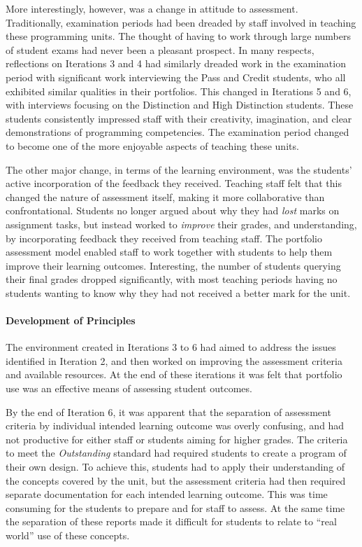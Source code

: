 More interestingly, however, was a change in attitude to assessment. Traditionally, examination periods had been dreaded by staff involved in teaching these programming units. The thought of having to work through large numbers of student exams had never been a pleasant prospect. In many respects, reflections on Iterations 3 and 4 had similarly dreaded work in the examination period with significant work interviewing the Pass and Credit students, who all exhibited similar qualities in their portfolios. This changed in Iterations 5 and 6, with interviews focusing on the Distinction and High Distinction students. These students consistently impressed staff with their creativity, imagination, and clear demonstrations of programming competencies. The examination period changed to become one of the more enjoyable aspects of teaching these units.

The other major change, in terms of the learning environment, was the students' active incorporation of the feedback they received. Teaching staff felt that this changed the nature of assessment itself, making it more collaborative than confrontational. Students no longer argued about why they had \emph{lost} marks on assignment tasks, but instead worked to \emph{improve} their grades, and understanding, by incorporating feedback they received from teaching staff. The portfolio assessment model enabled staff to work together with students to help them improve their learning outcomes. Interesting, the number of students querying their final grades dropped significantly, with most teaching periods having no students wanting to know why they had not received a better mark for the unit.

\paragraph{Development of Principles} %

The environment created in Iterations 3 to 6 had aimed to address the issues identified in Iteration 2, and then worked on improving the assessment criteria and available resources. At the end of these iterations it was felt that portfolio use was an effective means of assessing student outcomes.

By the end of Iteration 6, it was apparent that the separation of assessment criteria by individual intended learning outcome was overly confusing, and had not productive for either staff or students aiming for higher grades. The criteria to meet the \emph{Outstanding} standard had required students to create a program of their own design. To achieve this, students had to apply their understanding of the concepts covered by the unit, but the assessment criteria had then required separate documentation for each intended learning outcome. This was time consuming for the students to prepare and for staff to assess. At the same time the separation of these reports made it difficult for students to relate to ``real world'' use of these concepts.

